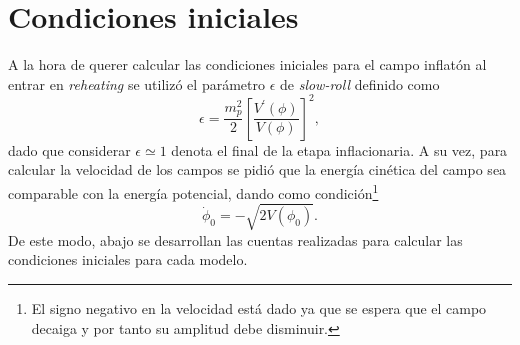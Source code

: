 \newpage

\chapter{Condiciones iniciales \CosmoLattice} \label{sec:apexB}

A la hora de querer calcular las condiciones iniciales para el campo inflatón al entrar en \textit{reheating} se utilizó el parámetro $\epsilon$ de \textit{slow-roll} definido como
\begin{equation}
    \epsilon = \frac{m_p^2}{2} \left[ \frac{V^{\prime} \left( \phi \right)}{V \left( \phi \right)} \right]^2,
\end{equation}
dado que considerar $\epsilon \simeq 1$ denota el final de la etapa inflacionaria. A su vez, para calcular la velocidad de los campos se pidió que la energía cinética del campo sea comparable con la energía potencial, dando como condición\footnote{El signo negativo en la velocidad está dado ya que se espera que el campo decaiga y por tanto su amplitud debe disminuir.}
\begin{equation}
    \dot{\phi}_0 = - \sqrt{2 V \left( \phi_0 \right)}. 
\end{equation}
De este modo, abajo se desarrollan las cuentas realizadas para calcular las condiciones iniciales para cada modelo.

